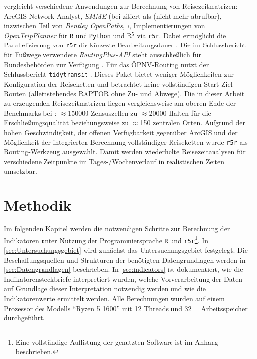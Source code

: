 \documentclass[11pt,pdftex,a4paper]{scrartcl}
\begin{document}
	 \textcite{higginsCalculatingPlacebasedTransit2022} vergleicht verschiedene Anwendungen zur Berechnung von Reisezeitmatrizen: ArcGIS Network Analyst, \textit{EMME} (bei \textcite{higginsCalculatingPlacebasedTransit2022} zitiert als \textcite{EMMEinro2019} (nicht mehr abrufbar), inzwischen Teil von \textit{Bentley OpenPaths}, \textcite{BentleyOpenPathsSoftware2024}), Implementierungen von \textit{OpenTripPlanner} für \texttt{R} und \texttt{Python} und R$^5$ via \texttt{r5r}. Dabei ermöglicht die Parallelisierung von \texttt{r5r} \parencite[5]{dellingRoundBasedPublicTransit2012} die kürzeste Bearbeitungsdauer \parencite[vgl.][107, Tabelle 3]{higginsCalculatingPlacebasedTransit2022}. Die im Schlussbericht für Fußwege verwendete \textit{RoutingPlus-API} steht ausschließlich für Bundesbehörden zur Verfügung \parencite{BKGRoutingPlusDienst2026}. Für das ÖPNV-Routing nutzt der Schlussbericht \texttt{tidytransit} \parencite{polettiTidytransitReadValidate2025}. Dieses Paket bietet weniger Möglichkeiten zur Konfiguration der Reiseketten und betrachtet keine vollständigen Start-Ziel-Routen (alleinstehendes RAPTOR ohne Zu- und Abwege). Die in dieser Arbeit zu erzeugenden Reisezeitmatrizen liegen vergleichsweise am oberen Ende der Benchmarks bei \citeauthor{higginsCalculatingPlacebasedTransit2022}: $\approx$\num{150000} Zensuszellen zu $\approx$\num{20000} Halten für die Erschließungsqualität beziehungsweise zu $\approx$\num{150} zentralen Orten. Aufgrund der hohen Geschwindigkeit, der offenen Verfügbarkeit gegenüber ArcGIS und der Möglichkeit der integrierten Berechnung vollständiger Reiseketten wurde \texttt{r5r} als Routing-Werkzeug ausgewählt. Damit werden wiederholte Reisezeitanalysen für verschiedene Zeitpunkte im Tages-/Wochenverlauf in realistischen Zeiten umsetzbar.
	\pagebreak
	\section{Methodik}
	\label{sec:Methods}
	Im folgenden Kapitel werden die notwendigen Schritte zur Berechnung der Indikatoren unter Nutzung der Programmiersprache \texttt{R} \parencite{base} und \texttt{r5r}\footnote{Eine vollständige Auflistung der genutzten Software ist im Anhang beschrieben.}. In \ref{sec:Untersuchungsgebiet} wird zunächst das Untersuchungsgebiet festgelegt. Die Beschaffungsquellen und Strukturen der benötigten Datengrundlagen werden in \ref{sec:Datengrundlagen} beschrieben. In \ref{sec:indicators} ist dokumentiert, wie die Indikatorensteckbriefe interpretiert wurden, welche Vorverarbeitung der Daten auf Grundlage dieser Interpretation notwendig werden und wie die Indikatorenwerte ermittelt werden. Alle Berechnungen wurden auf einem Prozessor des Modells \enquote{Ryzen 5 1600} mit 12 Threads und \SI{32}{\gibi\byte} Arbeitsspeicher durchgeführt.
\end{document}
